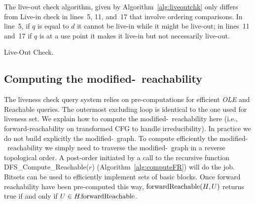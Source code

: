 The live-out check algorithm, given by Algorithm~\ref{alg:liveoutchk} only differs from Live-in check in lines~5, 11, and~17 that involve ordering comparisons.
In line~5, if $q$ is equal to $d$ it cannot be live-in while it might be live-out; in lines~11 and~17 if $q$ is at a use point it makes it live-in but not necessarily live-out.

\begin{algorithm}
  \caption{Live-Out Check.}
  \label{alg:liveoutchk}
\end{algorithm}


\subsection{Computing the modified-\reduced\ reachability}

The liveness check query system relies on pre-computations for efficient \textit{OLE} and \textrm{{\reduced}Reachable} queries.
The outermost excluding loop is identical to the one used for liveness set.
We explain how to compute the modified-\reduced\ reachability here (i.e., 
forward-reachability on transformed CFG to handle irreducibility).
In practice we do not build explicitly the modified-\reduced\ graph.
To compute efficiently the modified-\reduced\ reachability we simply need to traverse the modified-\reduced\ graph in a reverse topological order.
A post-order initiated by a call to the recursive function \textrm{DFS\_Compute\_{\reduced}Reachable}($r$) (Algorithm~\ref{alg:computeFR}) will do the job.
Bitsets can be used to efficiently implement sets of basic blocks.
Once forward reachability have been pre-computed this way, $\textrm{{forward}Reachable}(H,U)$ returns true if and only if $U\in H\!.\textrm{{forward}Reachable}$.

